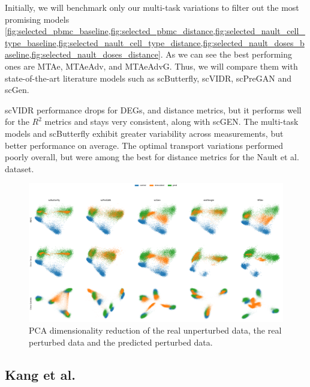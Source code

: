 \documentclass[12pt, a4paper]{article}
\begin{document}
Initially, we will benchmark only our multi-task variations to filter out the most promising models \cref{fig:selected_pbmc_baseline,fig:selected_pbmc_distance,fig:selected_nault_cell_type_baseline,fig:selected_nault_cell_type_distance,fig:selected_nault_doses_baseline,fig:selected_nault_doses_distance}.
As we can see the best performing ones are MTAe, MTAeAdv, and MTAeAdvG. Thus, we will compare them with state-of-the-art literature models such as scButterfly, scVIDR, scPreGAN and scGen.

scVIDR performance drops for DEGs, and distance metrics, but it performs well for the $R^2$ metrics and stays very consistent, along with scGEN. The multi-task models and scButterfly exhibit greater variability across measurements, but better performance on average. The optimal transport variations performed poorly overall, but were among the best for distance metrics for the Nault et al. \cite{nault2021single,nault2022benchmarking} dataset. 


\begin{figure}[h!]
    \centering
    \includegraphics[width=\textwidth]{pcas.png}
    \caption{PCA dimensionality reduction of the real unperturbed data, the real perturbed data and the predicted perturbed data.}
    \label{fig:selected_nault_cell_type_baseline}
\end{figure}

\clearpage

\subsection{Kang et al.}
\end{document}
